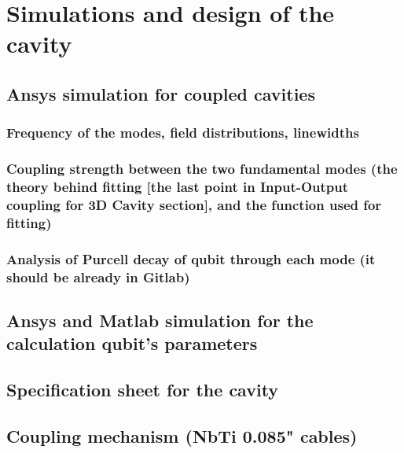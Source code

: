 \chapter{Simulations and design of the cavity}
\section{Ansys simulation for coupled cavities}
\subsection{Frequency of the modes, field distributions, linewidths}
\subsection{Coupling strength between the two fundamental modes (the theory behind fitting [the last point in Input-Output coupling for 3D Cavity section], and the function used for fitting)}
\subsection
{Analysis of Purcell decay of qubit through each mode (it should be already in Gitlab)}
\section{Ansys and Matlab simulation for the calculation qubit's parameters}
\section{Specification sheet for the cavity}
\section{Coupling mechanism (NbTi 0.085" cables)}
\section{}